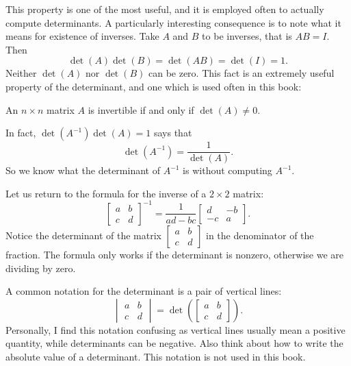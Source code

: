This property is one of the most useful, and it is employed often to 
actually compute determinants.  A particularly interesting consequence is to
note what it means for existence of inverses.
Take $A$ and $B$ to be inverses, that is $AB=I$.  Then
\begin{equation*}
\det(A)\det(B) = \det(AB) = \det(I) = 1 .
\end{equation*}
Neither $\det(A)$ nor $\det(B)$ can be zero.
This fact is an extremely useful property of the determinant, and one
which is used often in this book:

\begin{theorem1}{}
An $n \times n$ matrix $A$ is invertible if and only if $\det (A) \not= 0$.
\end{theorem1}

In fact, $\det(A^{-1}) \det(A) = 1$ says that
\begin{equation*}
\det(A^{-1}) =
\frac{1}{\det(A)}.
\end{equation*}
So we know what the determinant of $A^{-1}$ is
without computing $A^{-1}$.

Let us return to the formula for the inverse of a $2 \times 2$ matrix:
\begin{equation*}
\begin{bmatrix}
a & b \\
c & d
\end{bmatrix}^{-1}
=
\frac{1}{ad-bc}
\begin{bmatrix}
d & -b \\
-c & a
\end{bmatrix} .
\end{equation*}
Notice the determinant of the matrix
$[\begin{smallmatrix}a&b\\c&d\end{smallmatrix}]$
in the denominator of the fraction.
The formula only works if the determinant is nonzero, otherwise we are
dividing by zero.

%

\medskip


A common notation for the determinant is a pair of vertical
lines:
\begin{equation*}
\begin{vmatrix}
a & b \\
c & d
\end{vmatrix}
=
\det \left(
\begin{bmatrix}
a & b \\
c & d
\end{bmatrix}
\right) .
\end{equation*}
Personally, I find this notation confusing as vertical lines usually
mean a positive quantity, while determinants can be negative.  Also
think about how to write the absolute value of a determinant.
This notation is not used in this book.


